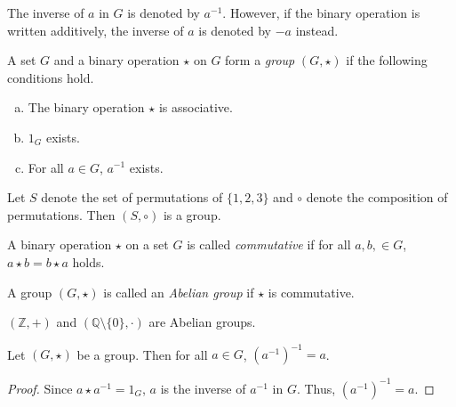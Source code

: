 \begin{notation}
  The inverse of $a$ in $G$ is denoted by $a^{-1}$.
  However, if the binary operation is written additively, the inverse of $a$
  is denoted by $-a$ instead.
\end{notation}

\begin{definition}
  A set $G$ and a binary operation $\star$ on $G$ form a \emph{group}
  $(G, \star)$ if the following conditions hold.
  \begin{enumerate}[(a)]
    \item The binary operation $\star$ is associative.
    \item $1_G$ exists.
    \item For all $a \in G$, $a^{-1}$ exists.
  \end{enumerate}
\end{definition}

\begin{example}
  Let $S$ denote the set of permutations of $\{1, 2, 3\}$ and $\circ$
  denote the composition of permutations. Then $(S, \circ)$ is a group.
\end{example}

\begin{definition}
  A binary operation $\star$ on a set $G$ is called \emph{commutative} if
  for all $a, b, \in G$, $a \star b = b \star a$ holds.
\end{definition}

\begin{definition}
  A group $(G, \star)$ is called an \emph{Abelian group} if $\star$ is
  commutative.
\end{definition}

\begin{example}
  $(\mathbb{Z}, +)$ and $(\mathbb{Q} \setminus \{0\}, \cdot)$ are Abelian
  groups.
\end{example}

\begin{theorem}
  Let $(G, \star)$ be a group. Then for all $a \in G$, $(a^{-1})^{-1} = a$.
\end{theorem}
\begin{proof}
  Since $a \star a^{-1} = 1_G$, $a$ is the inverse of $a^{-1}$ in $G$.
  Thus, $(a^{-1})^{-1} = a$.
\end{proof}

